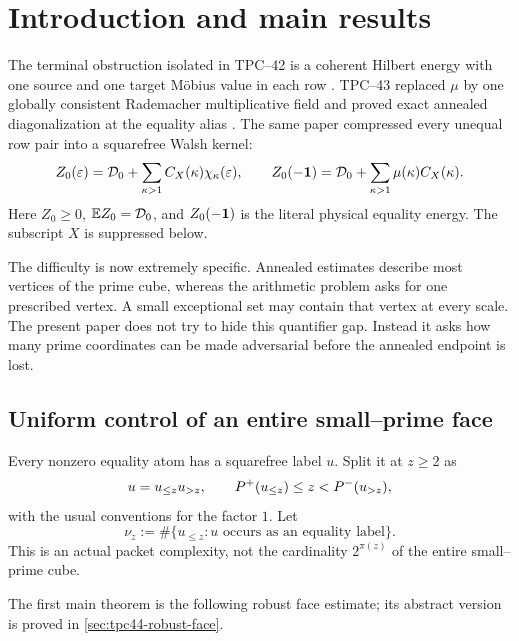 \section{Introduction and main results}
\label{sec:tpc44-introduction}

The terminal obstruction isolated in TPC--42 is a coherent Hilbert
energy with one source and one target M\"obius value in each row
\citep{WangTPC42}.  TPC--43 replaced \(\mu\) by one globally consistent
Rademacher multiplicative field and proved exact annealed
diagonalization at the equality alias \citep{WangTPC43}.  The same paper
compressed every unequal row pair into a squarefree Walsh kernel:
\begin{equation}
 Z_0(\varepsilon)
 =\mathcal D_0+\sum_{\kappa>1}C_X(\kappa)\chi_\kappa(\varepsilon),
 \qquad
 Z_0(-\mathbf 1)
 =\mathcal D_0+\sum_{\kappa>1}\mu(\kappa)C_X(\kappa).
 \label{eq:tpc44-intro-walsh}
\end{equation}
Here \(Z_0\ge0\), \(\mathbb E Z_0=\mathcal D_0\), and \(Z_0(-\mathbf 1)\) is the literal
physical equality energy.  The subscript \(X\) is suppressed below.

The difficulty is now extremely specific.  Annealed estimates describe
most vertices of the prime cube, whereas the arithmetic problem asks
for one prescribed vertex.  A small exceptional set may contain that
vertex at every scale.  The present paper does not try to hide this
quantifier gap.  Instead it asks how many prime coordinates can be made
adversarial before the annealed endpoint is lost.

\subsection{Uniform control of an entire small--prime face}

Every nonzero equality atom has a squarefree label \(u\).  Split it at
\(z\ge2\) as
\begin{equation}
 u=u_{\le z}u_{>z},
 \qquad
 P^{+}(u_{\le z})\le z<P^{-}(u_{>z}),
 \label{eq:tpc44-intro-label-split}
\end{equation}
with the usual conventions for the factor \(1\).  Let
\begin{equation}
 \nu_z:=\#\{u_{\le z}:u\text{ occurs as an equality label}\}.
 \label{eq:tpc44-intro-nu}
\end{equation}
This is an actual packet complexity, not the cardinality
\(2^{\pi(z)}\) of the entire small--prime cube.

The first main theorem is the following robust face estimate; its
abstract version is proved in \cref{sec:tpc44-robust-face}.

